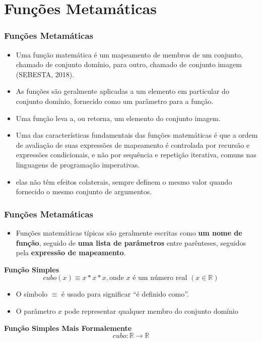 \section{Funções Metamáticas}

\begin{frame}
	\frametitle{Funções Metamáticas}
	\begin{itemize}
		\item Uma função matemática é um mapeamento de membros de um conjunto, 
		chamado de conjunto domínio, para outro, chamado de conjunto imagem (SEBESTA, 2018).
		\item As funções são geralmente aplicadas a um elemento em particular do conjunto domínio, fornecido como um parâmetro 
		para a função.
		\item Uma função leva a, ou retorna, um elemento do conjunto imagem.
		\item Uma das características fundamentais das funções matemáticas é que a 
		ordem de avaliação de suas expressões de mapeamento é controlada por recursão e expressões condicionais, e não por sequência e repetição iterativa, 
		comuns nas linguagens de programação imperativas.
		\item elas não têm efeitos colaterais, sempre definem o mesmo valor quando fornecido o mesmo conjunto de argumentos.
	\end{itemize}
\end{frame}



\begin{frame}
	\frametitle{Funções Metamáticas}
	\begin{itemize}
		\item Funções matemáticas típicas são geralmente escritas como \textbf{um nome de função}, seguido de \textbf{uma lista de parâmetros} entre parênteses, seguidos pela \textbf{expressão de mapeamento}.
	\end{itemize}

	\begin{block}{\textbf{Função Simples}}
		\[ cubo(x) \equiv x * x * x, \mbox{onde } x \mbox{ é um número real } (x \in \mathbb{R}) \]
	\end{block}

	\begin{itemize}
		\item O símbolo $\equiv$ é usado para significar ``é definido como''.
		\item O parâmetro $x$ pode representar qualquer membro do conjunto domínio
	\end{itemize}

	\begin{block}{\textbf{Função Simples Mais Formalemente}}
		\[ cubo: \mathbb{R} \rightarrow \mathbb{R} \]
	\end{block}
\end{frame}


